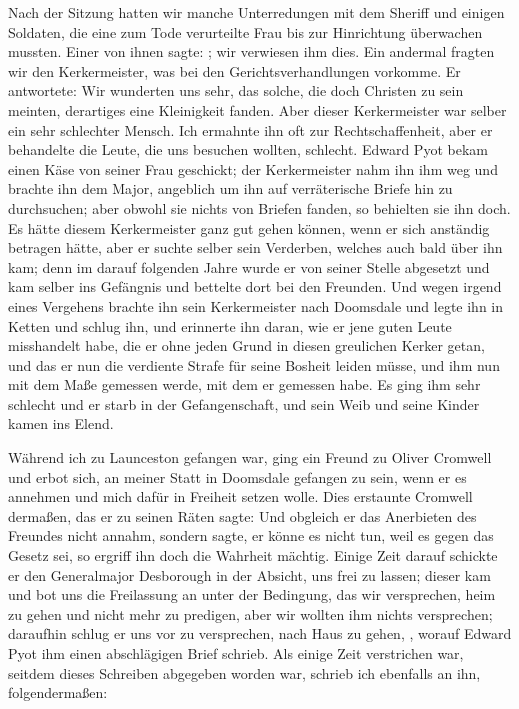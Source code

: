 Nach der Sitzung hatten wir manche Unterredungen mit dem
Sheriff und einigen Soldaten, die eine zum Tode verurteilte Frau
bis zur Hinrichtung überwachen mussten. Einer von ihnen sagte:
; wir
verwiesen ihm dies. Ein andermal fragten wir den Kerkermeister,
was bei den Gerichtsverhandlungen vorkomme. Er antwortete:
 Wir wunderten uns sehr, das solche, die doch
Christen zu sein meinten, derartiges eine Kleinigkeit fanden.
Aber dieser Kerkermeister war selber ein sehr schlechter Mensch.
Ich ermahnte ihn oft zur Rechtschaffenheit, aber er behandelte
die Leute, die uns besuchen wollten, schlecht. 
Edward Pyot bekam
einen Käse von seiner Frau geschickt; der Kerkermeister nahm ihn
ihm weg und brachte ihn dem Major, angeblich um ihn auf
verräterische Briefe hin zu durchsuchen; aber obwohl sie nichts
von Briefen fanden, so behielten sie ihn doch. Es hätte diesem
Kerkermeister ganz gut gehen können, wenn er sich anständig
betragen hätte, aber er suchte selber sein Verderben, welches auch
bald über ihn kam; denn im darauf folgenden Jahre wurde er
von seiner Stelle abgesetzt und kam selber ins Gefängnis und
bettelte dort bei den Freunden. Und wegen irgend eines 
Vergehens brachte ihn sein Kerkermeister nach Doomsdale und legte
ihn in Ketten und schlug ihn, und erinnerte ihn daran, wie er
jene guten Leute misshandelt habe, die er ohne jeden Grund in
diesen greulichen Kerker getan, und das er nun die verdiente
Strafe für seine Bosheit leiden müsse, und ihm nun mit dem
Maße gemessen werde, mit dem er gemessen habe. Es ging ihm
sehr schlecht und er starb in der Gefangenschaft, und sein Weib
und seine Kinder kamen ins Elend.


Während ich zu Launceston gefangen war, ging ein Freund
zu Oliver Cromwell und erbot 
sich, an meiner Statt in 
Doomsdale gefangen zu sein, wenn er es annehmen und mich dafür
in Freiheit setzen wolle. Dies erstaunte Cromwell dermaßen,
das er zu seinen Räten sagte:  Und obgleich er
das Anerbieten des Freundes nicht annahm, sondern sagte, er
könne es nicht tun, weil es gegen das Gesetz sei, so ergriff ihn
doch die Wahrheit mächtig. Einige Zeit darauf schickte er den
Generalmajor Desborough 
in der Absicht, uns frei zu lassen;
dieser kam und bot uns die Freilassung an unter der Bedingung,
das wir versprechen, heim zu gehen und nicht mehr zu predigen,
aber wir wollten ihm nichts versprechen; daraufhin schlug er uns
vor zu versprechen, nach Haus zu gehen, , worauf Edward Pyot ihm 
einen abschlägigen Brief schrieb.
Als einige Zeit verstrichen war, seitdem dieses Schreiben
abgegeben worden war, schrieb ich ebenfalls an ihn, 
folgendermaßen:


